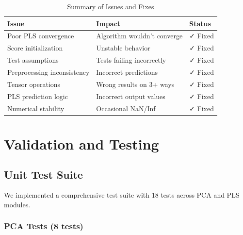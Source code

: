 \documentclass[12pt,a4paper]{article}
\begin{document}
\begin{table}[H]
\centering
\caption{Summary of Issues and Fixes}
\begin{tabular}{lll}
\toprule
\textbf{Issue} & \textbf{Impact} & \textbf{Status} \\
\midrule
Poor PLS convergence & Algorithm wouldn't converge & ✓ Fixed \\
Score initialization & Unstable behavior & ✓ Fixed \\
Test assumptions & Tests failing incorrectly & ✓ Fixed \\
Preprocessing inconsistency & Incorrect predictions & ✓ Fixed \\
Tensor operations & Wrong results on 3+ ways & ✓ Fixed \\
PLS prediction logic & Incorrect output values & ✓ Fixed \\
Numerical stability & Occasional NaN/Inf & ✓ Fixed \\
\bottomrule
\end{tabular}
\end{table}

\newpage

\section{Validation and Testing}

\subsection{Unit Test Suite}

We implemented a comprehensive test suite with 18 tests across PCA and PLS modules.

\subsubsection{PCA Tests (8 tests)}
\end{document}
